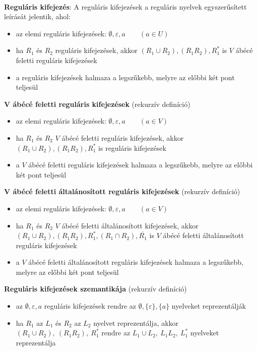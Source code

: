 \documentclass[12pt,margin=0px]{article}
\begin{document}
    {\footnotesize \noindent {\color{blue} \faLightbulbO\ $\triangleright$ } }
    {\footnotesize\\
    \noindent \textbf{Reguláris kifejezés}: A reguláris kifejezések a reguláris nyelvek egyszerűsített leírását jelentik, ahol:
    \begin{itemize}
        \item az elemi reguláris kifejezések: $\emptyset, \varepsilon, a \qquad (a \in U)$
        \item ha $R_1$ és $R_2$ reguláris kifejezések, akkor $(R_1 \cup R_2), (R_1R_2),R_1^{*}$ is $V$ ábécé feletti reguláris kifejezések
        \item a reguláris kifejezések halmaza a legszűkebb, melyre az előbbi két pont teljesül\\
    \end{itemize}

    \noindent \textbf{V ábécé feletti reguláris kifejezések} (rekurzív definíció)
    \begin{itemize}
        \item az elemi reguláris kifejezések: $\emptyset, \varepsilon, a \qquad (a \in V)$
        \item ha $R_1$ és $R_2$ $V$ ábécé feletti reguláris kifejezések, akkor $(R_1 \cup R_2), (R_1R_2),R_1^{*}$ is reguláris kifejezések
        \item a $V$ ábécé feletti reguláris kifejezések halmaza a legszűkebb, melyre az előbbi két pont teljesül\\
    \end{itemize}

    \noindent \textbf{V ábécé feletti általánosított reguláris kifejezések} (rekurzív definíció)
    \begin{itemize}
        \item az elemi reguláris kifejezések: $\emptyset, \varepsilon, a \qquad (a \in V)$
        \item ha $R_1$ és $R_2$ $V$ ábécé feletti általánosított kifejezések, akkor $(R_1 \cup R_2), (R_1R_2), R_1^{*}, (R_1 \cap R_2), \overline{R_1}$ is $V$ ábécé feletti általánosított reguláris kifejezések
        \item a $V$ ábécé feletti általánosított reguláris kifejezések halmaza a legszűkebb, melyre az előbbi két pont teljesül\\
    \end{itemize}

    \noindent \textbf{Reguláris kifejezések szemantikája} (rekurzív definíció)
    \begin{itemize}
        \item az $\emptyset, \varepsilon, a$ reguláris kifejezések rendre az $\emptyset, \{\varepsilon\}, \{a\}$ nyelveket reprezentálják
        \item ha $R_1$ az $L_1$ és $R_2$ az $L_2$ nyelvet reprezentálja, akkor $(R_1 \cup R_2),\ (R_1R_2),\ R_1^{*}$ rendre az $L_1 \cup L_2,\ L_1L_2,\ L_1^{*}$ nyelveket reprezentálja
    \end{itemize}

}
\end{document}
